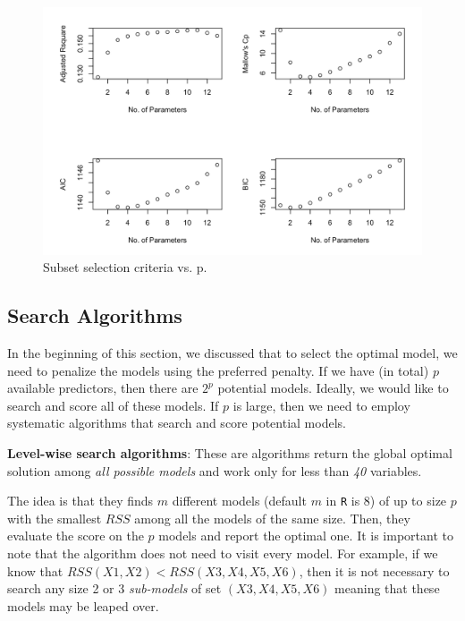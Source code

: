 \documentclass[
]{book}
\begin{document}
\begin{figure}

{\centering \includegraphics[width=0.95\linewidth]{images/week3/criteria} 

}

\caption{Subset selection criteria vs. p.}\label{fig:unnamed-chunk-66}
\end{figure}

\subsection{Search Algorithms}\label{search-algorithms}

In the beginning of this section, we discussed that to select the optimal model, we need to penalize the models using the preferred penalty. If we have (in total) \(p\) available predictors, then there are \(2^p\) potential models. Ideally, we would like to search and score all of these models. If \(p\) is large, then we need to employ systematic algorithms that search and score potential models.

\textbf{Level-wise search algorithms}: These are algorithms return the global optimal solution among \emph{all possible models} and work only for less than \emph{40} variables.

The idea is that they finds \(m\) different models (default \(m\) in \texttt{R} is 8) of up to size \(p\) with the smallest \(RSS\) among all the models of the same size. Then, they evaluate the score on the \(p\) models and report the optimal one. It is important to note that the algorithm does not need to visit every model. For example, if we know that \(RSS(X1, X2) < RSS(X3, X4, X5, X6)\), then it is not necessary to search any size 2 or 3 \emph{sub-models} of set \((X3, X4, X5, X6)\) meaning that these models may be leaped over.
\end{document}
